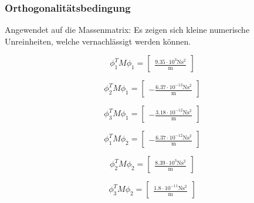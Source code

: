 \documentclass[
  letterpaper,
  DIV=11]{scrreprt}
\begin{document}
\hypertarget{orthogonalituxe4tsbedingung-2}{%
\subsubsection{Orthogonalitätsbedingung}\label{orthogonalituxe4tsbedingung-2}}

Angewendet auf die Massenmatrix: Es zeigen sich kleine numerische
Unreinheiten, welche vernachlässigt werden können.

\begin{equation}\phi_{1}^{T} M \phi_{1} = \left[\begin{matrix}\frac{9.35 \cdot 10^{3} \text{N} \text{s}^{2}}{\text{m}}\end{matrix}\right]\end{equation}

\begin{equation}\phi_{2}^{T} M \phi_{1} = \left[\begin{matrix}- \frac{6.37 \cdot 10^{-12} \text{N} \text{s}^{2}}{\text{m}}\end{matrix}\right]\end{equation}

\begin{equation}\phi_{3}^{T} M \phi_{1} = \left[\begin{matrix}- \frac{3.18 \cdot 10^{-12} \text{N} \text{s}^{2}}{\text{m}}\end{matrix}\right]\end{equation}

\begin{equation}\phi_{1}^{T} M \phi_{2} = \left[\begin{matrix}- \frac{6.37 \cdot 10^{-12} \text{N} \text{s}^{2}}{\text{m}}\end{matrix}\right]\end{equation}

\begin{equation}\phi_{2}^{T} M \phi_{2} = \left[\begin{matrix}\frac{8.39 \cdot 10^{3} \text{N} \text{s}^{2}}{\text{m}}\end{matrix}\right]\end{equation}

\begin{equation}\phi_{3}^{T} M \phi_{2} = \left[\begin{matrix}\frac{1.8 \cdot 10^{-11} \text{N} \text{s}^{2}}{\text{m}}\end{matrix}\right]\end{equation}
\end{document}
